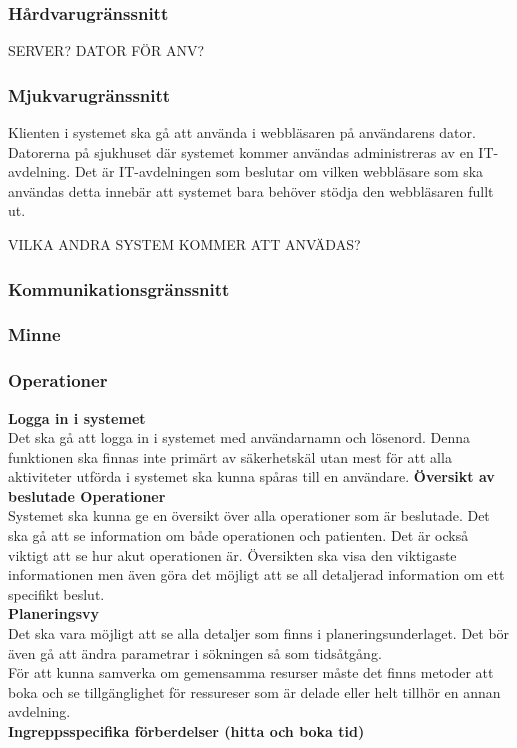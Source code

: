 \documentclass{article}
\begin{document}
\begin{enumerate}
\subsubsection{Hårdvarugränssnitt}
\label{subsec:Hardvarugranssnitt}
SERVER? DATOR FÖR ANV?
\subsubsection{Mjukvarugränssnitt}
\label{subsec:Mjukvarugranssnitt}
Klienten i systemet ska gå att använda i webbläsaren på användarens dator.
Datorerna på sjukhuset där systemet kommer användas administreras av en
IT-avdelning. Det är IT-avdelningen som beslutar om vilken webbläsare som ska
användas detta innebär att systemet bara behöver stödja den webbläsaren fullt
ut.

VILKA ANDRA SYSTEM KOMMER ATT ANVÄDAS?
\subsubsection{Kommunikationsgränssnitt}
\label{subsec:Kommunikationsgranssnitt}
\subsubsection{Minne}
\label{subsec:Minne}
\subsubsection{Operationer}
\label{subsec:Operationer}
\textbf{Logga in i systemet}\\
Det ska gå att logga in i systemet med användarnamn och lösenord. Denna
funktionen ska finnas inte primärt av säkerhetskäl utan mest för att alla
aktiviteter utförda i systemet ska kunna spåras till en användare.
\textbf{Översikt av beslutade Operationer}\\
Systemet ska kunna ge en översikt över alla operationer som är beslutade.
Det ska gå att se information om både operationen och patienten. Det är också
viktigt att se hur akut operationen är. Översikten ska visa den viktigaste
informationen men även göra det möjligt att se all detaljerad information om ett
specifikt beslut.\\
\textbf{Planeringsvy}\\
Det ska vara möjligt att se alla detaljer som finns i planeringsunderlaget.
Det bör även gå att ändra parametrar i sökningen så som tidsåtgång.\\
För att kunna samverka om gemensamma resurser måste det finns metoder att boka
och se tillgänglighet för ressureser som är delade eller helt tillhör en annan
avdelning.\\
\textbf{Ingreppsspecifika förberdelser (hitta och boka tid)}\\


\end{enumerate}
\end{document}
